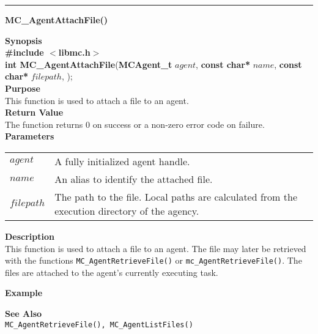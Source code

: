 \noindent
\vspace{5pt}
\rule{6.5in}{0.015in}
\noindent
{}
{\LARGE \bf MC\_AgentAttachFile()}\\

\noindent
{\bf Synopsis}\\
{\bf \#include $<$libmc.h$>$}\\
{\bf int MC\_AgentAttachFile}({\bf MCAgent\_t} $agent$, 
                                  {\bf const char*} $name$,
                                  {\bf const char*} $filepath$,
																	);\\

\noindent
{\bf Purpose}\\
This function is used to attach a file to an agent.\\

\noindent
{\bf Return Value}\\
The function returns 0 on success or a non-zero error code on failure.\\

\noindent
{\bf Parameters}
\vspace{-0.1in}
\begin{description}
\item
\begin{tabular}{p{30 mm}p{125 mm}} 
$agent$ & A fully initialized agent handle.\\
$name$ & An alias to identify the attached file.\\
$filepath$ & The path to the file. Local paths are calculated from the
execution directory of the agency.\\
\end{tabular}
\end{description}

\noindent
{\bf Description}\\
This function is used to attach a file to an agent. The file may later be retrieved
with the functions \texttt{MC\_AgentRetrieveFile()} or
\texttt{mc\_AgentRetrieveFile()}. The files are attached to the
agent's currently executing task.

\noindent
{\bf Example}\\
\noindent
{\footnotesize}
{\footnotesize}

\noindent
{\bf See Also}\\
\texttt{MC\_AgentRetrieveFile(), MC\_AgentListFiles()}

